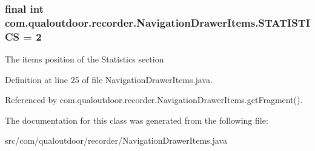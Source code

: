 \hypertarget{classcom_1_1qualoutdoor_1_1recorder_1_1NavigationDrawerItems_aac54515cf8ace5b4359c3e1f417fa753}{
\subsubsection[{S\-T\-A\-T\-I\-S\-T\-I\-C\-S}]{\setlength{\rightskip}{0pt plus 5cm}final int com.\-qualoutdoor.\-recorder.\-Navigation\-Drawer\-Items.\-S\-T\-A\-T\-I\-S\-T\-I\-C\-S = 2\hspace{0.3cm}{\ttfamily [static]}}}\label{classcom_1_1qualoutdoor_1_1recorder_1_1NavigationDrawerItems_aac54515cf8ace5b4359c3e1f417fa753}
The items position of the Statistics section 

Definition at line 25 of file Navigation\-Drawer\-Items.\-java.



Referenced by com.\-qualoutdoor.\-recorder.\-Navigation\-Drawer\-Items.\-get\-Fragment().



The documentation for this class was generated from the following file\-:\begin{DoxyCompactItemize}
\item 
src/com/qualoutdoor/recorder/Navigation\-Drawer\-Items.\-java\end{DoxyCompactItemize}
